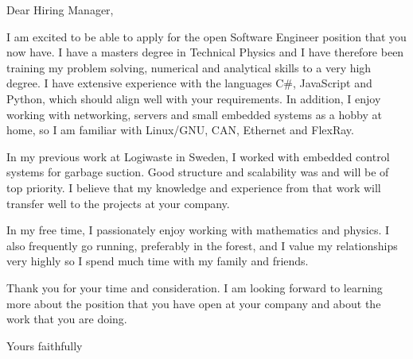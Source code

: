Dear Hiring Manager,

I am excited to be able to apply for the open Software Engineer position that you now have. I have a masters degree in Technical Physics and I have therefore been training my problem solving, numerical and analytical skills to a very high degree. I have extensive experience with the languages C\#, JavaScript and Python, which should align well with your requirements. In addition, I enjoy working with networking, servers and small embedded systems as a hobby at home, so I am familiar with Linux/GNU, CAN, Ethernet and FlexRay.

In my previous work at Logiwaste in Sweden, I worked with embedded control systems for garbage suction. Good structure and scalability was and will be of top priority. I believe that my knowledge and experience from that work will transfer well to the projects at your company.

In my free time, I passionately enjoy working with mathematics and physics. I also frequently go running, preferably in the forest, and I value my relationships very highly so I spend much time with my family and friends.

Thank you for your time and consideration. I am looking forward to learning more about the position that you have open at your company and about the work that you are doing.

Yours faithfully




































